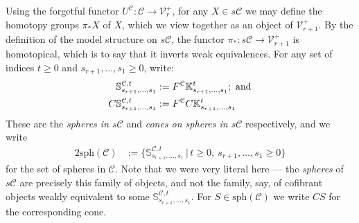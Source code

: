 \documentclass[11pt]{amsart} \renewcommand{\baselinestretch}{1.2}
\theoremstyle{plain}
\theoremstyle{definition}
\renewcommand{\to}{\longrightarrow}
\newcommand{\calV}{\mathcal{V}}
\newcommand{\calc}{\mathcal{C}}
\newcommand{\spheres}[1]{\mathrm{sph}(#1)}
\newcommand{\cones}[1]{\mathrm{con}(#1)}
\newcommand{\vect}[2]{\calV^{#1}_{#2}}
\begin{document}
\begin{Pi-algebras and cohomology algebras}
Using the forgetful functor $U^\calc:\calc\to \vect{+}{r}$, for any $X\in s\calc$ we may define the homotopy groups $\pi_*X$ of $X$,
which we view together as an object  of $\vect{+}{r+1}$. By the definition of the model structure on $s\calc$, the functor $\pi_*:s\calc\to \vect{+}{r+1}$ is homotopical, which is to say that it inverts weak equivalences. For any set of indices $t\geq0$ and $s_{r+1},\ldots,s_1\geq0$, write:
\begin{alignat*}{2}
\mathbb{S}^{\calc,t}_{s_{r+1},\ldots,s_1}
&:=
F^\calc \mathbb{K}^{t}_{s_{r+1},\ldots,s_1};\textup{ and}
\\
C\mathbb{S}^{\calc,t}_{s_{r+1},\ldots,s_1}
&:=
F^\calc C\mathbb{K}^{t}_{s_{r+1},\ldots,s_1}%
\end{alignat*}
These are the \emph{spheres in $s\calc$} and \emph{cones on spheres in $s\calc$} respectively, and we write
\begin{alignat*}{2}
\spheres{\calc}&:=\bigl\{\mathbb{S}^{\calc,t}_{s_{r+1},\ldots,s_1}\,|\,t\geq0,\ s_{r+1},\ldots,s_1\geq0\bigr\} %
\end{alignat*}
for the set of spheres in $\calc$. Note that we were very literal here --- the \emph{spheres} of $s\calc$ are precisely this family of objects, and not the family, say, of cofibrant objects weakly equivalent to some $\mathbb{S}^{\calc,t}_{s_{r+1},\ldots,s_1}$. For $S\in \spheres{\calc}$ we write $CS$ for the corresponding cone.


\end{Pi-algebras and cohomology algebras}
\end{document}
